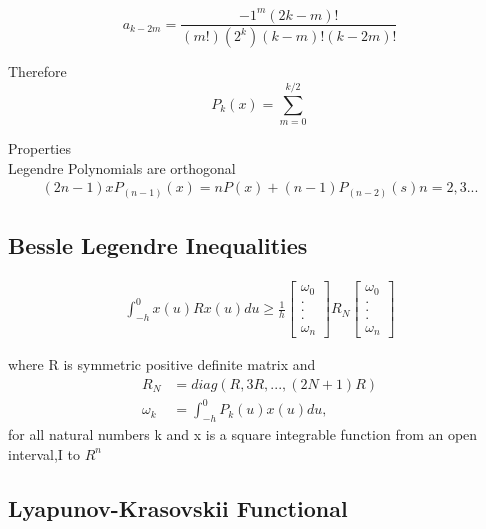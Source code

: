 \documentclass[journal]{IEEEtran}
\begin{document}
    \begin{equation}
    a_{k-2m} = \frac{-1^m(2k-m)!}{(m!)(2^k)(k-m)!(k-2m)!}
  \end{equation}


  
    Therefore
    \begin{equation}
    P_k(x) = \sum_{m=0}^{k/2} 
  \end{equation}

   Properties \\
    Legendre Polynomials are orthogonal
    \begin{align}
    (2n-1)xP_(n-1)(x) = nP(x) + (n-1)P_(n-2)(s) n = 2, 3 ...
  \end{align}

    

\subsection{Bessle Legendre Inequalities}
 \begin{align}
   \int_{-h}^{0}x(u)Rx(u)du \geq \frac{1}{h}
   \begin{bmatrix}
     \omega_0 \\
     . \\
     . \\
     . \\
     \omega_n
   \end{bmatrix}
   R_N
   \begin{bmatrix}
  \omega_0 \\
  . \\
  . \\
  . \\
  \omega_n
\end{bmatrix}
 \end{align}

 where R is symmetric positive definite matrix
 and 
 \begin{align}
   R_N &= diag(R,3R,...,(2N+1)R) \\
   \omega_k&= \int_{-h}^{0}P_k(u)x(u)du, 
 \end{align}
 for all natural numbers k and x is a square integrable function
 from an open interval,I to $R^n$
\subsection{Lyapunov-Krasovskii Functional}
\end{document}
